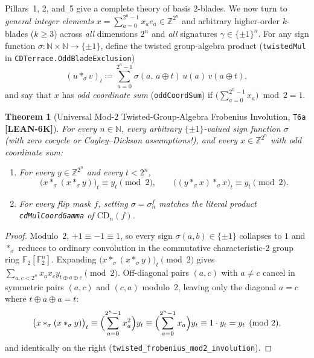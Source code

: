 \documentclass[11pt,reqno]{amsart}
\newcommand{\code}[1]{\textnormal{\texttt{\small\nolinkurl{#1}}}}
\theoremstyle{plain}
\newtheorem{theorem}{Theorem}[section]
\theoremstyle{definition}
\theoremstyle{remark}
\newcommand{\tagLean}{\mbox{\textsf{\textbf{\color{oiBlue}[LEAN-6K]}}}}
\newcommand{\CD}{\mathrm{CD}}
\newcommand{\Z}{\mathbb{Z}}
\newcommand{\F}{\mathbb{F}}
\newcommand{\N}{\mathbb{N}}
\begin{document}
Pillars~1, 2, and~5 give a complete theory of basis $2$-blades. We now turn to \emph{general
integer elements} $x = \sum_{a = 0}^{2^n - 1} x_a e_a \in \Z^{2^n}$ and arbitrary higher-order
$k$-blades ($k \ge 3$) across \emph{all} dimensions $2^n$ and \emph{all} signatures
$\gamma \in \{\pm 1\}^n$. For any sign function $\sigma : \N \times \N \to \{\pm 1\}$, define the
twisted group-algebra product (\code{twistedMul} in \code{CDTerrace.OddBladeExclusion})
\begin{equation}
  (u *_\sigma v)_t \coloneqq \sum_{a = 0}^{2^n - 1} \sigma(a,\, a \oplus t)\, u(a)\, v(a \oplus t),
\end{equation}
and say that $x$ has \emph{odd coordinate sum} (\code{oddCoordSum}) if
$\bigl(\sum_{a = 0}^{2^n - 1} x_a\bigr) \bmod 2 = 1$.

\begin{theorem}[Universal Mod-$2$ Twisted-Group-Algebra Frobenius Involution, \texttt{T6a} \tagLean]
\label{thm:t6a}
For every $n \in \N$, every arbitrary $\{\pm 1\}$-valued sign function $\sigma$
(with zero cocycle or Cayley--Dickson assumptions!), and every $x \in \Z^{2^n}$ with odd
coordinate sum:
\begin{enumerate}[leftmargin=2em]
  \item For every $y \in \Z^{2^n}$ and every $t < 2^n$,
    \begin{equation}
    \label{eq:mod2_inv}
      \bigl(x *_\sigma (x *_\sigma y)\bigr)_t \equiv y_t \pmod 2,
      \qquad
      \bigl((y *_\sigma x) *_\sigma x\bigr)_t \equiv y_t \pmod 2.
    \end{equation}
  \item For every flip mask $f$, setting $\sigma = \sigma_n^f$ matches the literal
    product \code{cdMulCoordGamma} of $\CD_n(f)$.
\end{enumerate}
\end{theorem}

\begin{proof}
Modulo~$2$, $+1 \equiv -1 \equiv 1$, so every sign $\sigma(a, b) \in \{\pm 1\}$ collapses to $1$
and $*_\sigma$ reduces to ordinary convolution in the commutative characteristic-$2$ group ring
$\F_2[\F_2^n]$. Expanding $\bigl(x *_\sigma (x *_\sigma y)\bigr)_t \pmod 2$ gives
$\sum_{a, c < 2^n} x_a x_c y_{t \oplus a \oplus c} \pmod 2$. Off-diagonal pairs $(a, c)$ with
$a \neq c$ cancel in symmetric pairs $(a, c)$ and $(c, a)$ modulo~$2$, leaving only the diagonal
$a = c$ where $t \oplus a \oplus a = t$:
\[
  \bigl(x *_\sigma (x *_\sigma y)\bigr)_t
  \equiv \Bigl(\sum_{a = 0}^{2^n - 1} x_a^2\Bigr) y_t
  \equiv \Bigl(\sum_{a = 0}^{2^n - 1} x_a\Bigr) y_t
  \equiv 1 \cdot y_t = y_t \pmod 2,
\]
and identically on the right (\code{twisted_frobenius_mod2_involution}).
\end{proof}
\end{document}
